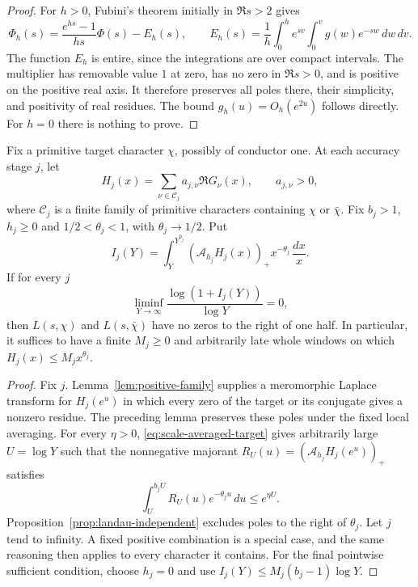 \begin{proof}
For $h>0$, Fubini's theorem initially in $\Re s>2$ gives
\[
 \Phi_h(s)=\frac{e^{hs}-1}{hs}\Phi(s)-E_h(s),\qquad
 E_h(s)=\frac1h\int_0^h e^{sv}\int_0^v g(w)e^{-sw}\,dw\,dv.
\]
The function $E_h$ is entire, since the integrations are over compact
intervals. The multiplier has removable value $1$ at zero, has no zero
in $\Re s>0$, and is positive on the positive real axis. It therefore
preserves all poles there, their simplicity, and positivity of real
residues. The bound $g_h(u)=O_h(e^{2u})$ follows directly. For $h=0$
there is nothing to prove.
\end{proof}

\begin{theorem}
\label{thm:scale-averaged-criterion}
\label{thm:vanishing-loss-windows}
\label{cor:varying-positive-families}
Fix a primitive target character $\chi$, possibly of conductor one.
At each accuracy stage $j$, let
\[
 H_j(x)=\sum_{\nu\in\mathcal C_j}a_{j,\nu}\Re G_\nu(x),
 \qquad a_{j,\nu}>0,
\]
where $\mathcal C_j$ is a finite family of primitive characters containing
$\chi$ or $\bar\chi$.
Fix $b_j>1$, $h_j\ge0$ and $1/2<\theta_j<1$, with
$\theta_j\to1/2$. Put
\[
 I_j(Y)=\int_Y^{Y^{b_j}}(\mathcal A_{h_j}H_j(x))_+
                         x^{-\theta_j}\,\frac{dx}{x}.
\]
If for every $j$
\begin{equation}\label{eq:scale-averaged-target}
 \liminf_{Y\to\infty}\frac{\log(1+I_j(Y))}{\log Y}=0,
\end{equation}
then $L(s,\chi)$ and $L(s,\bar\chi)$ have no zeros to the right
of one half. In particular, it suffices to have a finite $M_j\ge0$
and arbitrarily late whole windows on which
$H_j(x)\le M_jx^{\theta_j}$.
\end{theorem}

\begin{proof}
Fix $j$. Lemma~\ref{lem:positive-family} supplies a meromorphic
Laplace transform for $H_j(e^u)$ in which every zero of the target
or its conjugate gives a nonzero residue. The preceding lemma
preserves these poles under the fixed local averaging.
For every $\eta>0$, \eqref{eq:scale-averaged-target} gives arbitrarily
large $U=\log Y$ such that the nonnegative majorant
$R_U(u)=(\mathcal A_{h_j}H_j(e^u))_+$ satisfies
\[
 \int_U^{b_jU}R_U(u)e^{-\theta_ju}\,du\le e^{\eta U}.
\]
Proposition~\ref{prop:landau-independent} excludes poles to the right
of $\theta_j$. Let $j$ tend to infinity. A fixed positive combination
is a special case, and the same reasoning then applies to every
character it contains. For the final pointwise sufficient condition,
choose $h_j=0$ and use $I_j(Y)\le M_j(b_j-1)\log Y$.
\end{proof}


